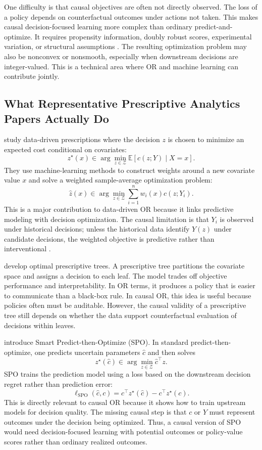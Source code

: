 \documentclass[11pt]{article}
\begin{document}
One difficulty is that causal objectives are often not directly observed. The loss of a policy depends on counterfactual outcomes under actions not taken. This makes causal decision-focused learning more complex than ordinary predict-and-optimize. It requires propensity information, doubly robust scores, experimental variation, or structural assumptions \citep{dudik2011doubly,swaminathan2015counterfactual,athey2021policy}. The resulting optimization problem may also be nonconvex or nonsmooth, especially when downstream decisions are integer-valued. This is a technical area where OR and machine learning can contribute jointly.

\subsection{What Representative Prescriptive Analytics Papers Actually Do}

\citet{bertsimas2020predictive} study data-driven prescriptions where the decision $z$ is chosen to minimize an expected cost conditional on covariates:
\[
    z^\star(x)\in\arg\min_{z\in\mathcal{Z}}\mathbb{E}[c(z;Y)\mid X=x].
\]
They use machine-learning methods to construct weights around a new covariate value $x$ and solve a weighted sample-average optimization problem:
\[
    \hat{z}(x)
    \in
    \arg\min_{z\in\mathcal{Z}}
    \sum_{i=1}^{n}w_i(x)c(z;Y_i).
\]
This is a major contribution to data-driven OR because it links predictive modeling with decision optimization. The causal limitation is that $Y_i$ is observed under historical decisions; unless the historical data identify $Y(z)$ under candidate decisions, the weighted objective is predictive rather than interventional \citep{bertsimas2020predictive,fernandez2022causal}.

\citet{bertsimas2019optimal} develop optimal prescriptive trees. A prescriptive tree partitions the covariate space and assigns a decision to each leaf. The model trades off objective performance and interpretability. In OR terms, it produces a policy that is easier to communicate than a black-box rule. In causal OR, this idea is useful because policies often must be auditable. However, the causal validity of a prescriptive tree still depends on whether the data support counterfactual evaluation of decisions within leaves.

\citet{elmachtoub2022smart} introduce Smart Predict-then-Optimize (SPO). In standard predict-then-optimize, one predicts uncertain parameters $\hat{c}$ and then solves
\[
    z^\star(\hat{c})\in\arg\min_{z\in\mathcal{Z}}\hat{c}^{\top}z.
\]
SPO trains the prediction model using a loss based on the downstream decision regret rather than prediction error:
\[
    \ell_{\mathrm{SPO}}(\hat{c},c)
    =
    c^{\top}z^\star(\hat{c}) - c^{\top}z^\star(c).
\]
This is directly relevant to causal OR because it shows how to train upstream models for decision quality. The missing causal step is that $c$ or $Y$ must represent outcomes under the decision being optimized. Thus, a causal version of SPO would need decision-focused learning with potential outcomes or policy-value scores rather than ordinary realized outcomes.
\end{document}
